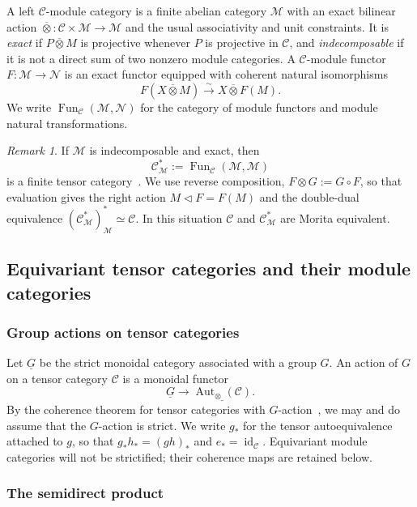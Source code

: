 \documentclass[12pt]{amsart}
\theoremstyle{plain}
\theoremstyle{definition} %
\theoremstyle{remark} %
\newtheorem{remark}[theorem]{Remark}
\newcommand{\cC}{\mathcal{C}}
\newcommand{\cM}{\mathcal{M}}
\newcommand{\cN}{\mathcal{N}}
\newcommand{\AutT}{\operatorname{Aut}_{\otimes}} %
\newcommand{\Fun}{\operatorname{Fun}}
\newcommand{\id}{\operatorname{id}}
\begin{document}
A left $\cC$-module category is a finite abelian category $\cM$ with an exact bilinear action $\overline\otimes:\cC\times\cM\to\cM$ and the usual associativity and unit constraints. It is \emph{exact} if $P\overline\otimes M$ is projective whenever $P$ is projective in $\cC$, and \emph{indecomposable} if it is not a direct sum of two nonzero module categories. A $\cC$-module functor $F:\cM\to\cN$ is an exact functor equipped with coherent natural isomorphisms
\[
F(X\overline\otimes M)\xrightarrow{\sim}X\overline\otimes F(M).
\]
We write $\Fun_{\cC}(\cM,\cN)$ for the category of module functors and module natural transformations.

\begin{remark}
If $\cM$ is indecomposable and exact, then
\[
\cC^*_{\cM}:=\Fun_{\cC}(\cM,\cM)
\]
is a finite tensor category~\cite[Theorem~3.27]{EO04}. We use reverse composition, $F\otimes G:=G\circ F$, so that evaluation gives the right action $M\triangleleft F=F(M)$ and the double-dual equivalence $(\cC^*_{\cM})^*_{\cM}\simeq\cC$. In this situation $\cC$ and $\cC^*_{\cM}$ are Morita equivalent.
\end{remark}


\subsection{Equivariant tensor categories and their module categories}


\subsubsection{Group actions on tensor categories}

Let $\underline G$ be the strict monoidal category associated with a group $G$. An action of $G$ on a tensor category $\cC$ is a monoidal functor
\[
\underline G\longrightarrow \underline{\AutT(\cC)}.
\]
By the coherence theorem for tensor categories with $G$-action~\cite[Theorem~2.4]{Gal17}, we may and do assume that the $G$-action is strict. We write $g_*$ for the tensor autoequivalence attached to $g$, so that $g_*h_*=(gh)_*$ and $e_*=\id_{\cC}$. Equivariant module categories will not be strictified; their coherence maps are retained below.

\subsubsection{The semidirect product}
\end{document}
